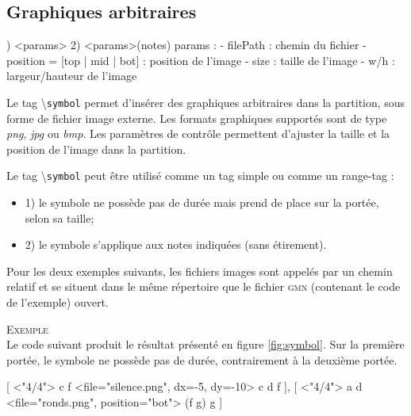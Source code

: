 \documentclass{article}
\newenvironment{gmncode}	{\vspace{-2mm}\small\verbatim}{\endverbatim\vspace{-2mm}}
\newcommand{\gmn}			{\textsc{gmn}}
\newcommand{\code}[1]		{{\small \texttt{#1}}}
\newcommand{\guidotag}[1]	{\textbackslash\code{#1}}
\newcommand{\exemple}		{\vspace{2mm}\hspace*{-6mm}\textsc{Exemple}}
\begin{document}
\subsection{Graphiques arbitraires}\label{subsec:graphiquesAbstraites}
\bigskip

\begin{gmncode}
1) \symbol<params>
2) \symbol<params>(notes)
  params : 
    - filePath : chemin du fichier
    - position = [top | mid | bot] :
      position de l'image
    - size : taille de l'image
    - w/h : largeur/hauteur de l'image
\end{gmncode}

Le tag \guidotag{symbol} permet d'insérer des graphiques arbitraires dans la partition, sous forme de fichier image externe. Les formats graphiques supportés sont de type \emph{png}, \emph{jpg} ou \emph{bmp}. Les paramètres de contrôle permettent d'ajuster la taille et la position de l'image dans la partition.

Le tag \guidotag{symbol} peut être utilisé comme un tag simple ou comme un range-tag :
\begin{itemize}
	\item 1) le symbole ne possède pas de durée mais prend de place sur la portée, selon sa taille;
	\item 2) le symbole s'applique aux notes indiquées (sans étirement).
\end{itemize}

Pour les deux exemples suivants, les fichiers images sont appelés par un chemin relatif et se situent dans le même répertoire que le fichier \gmn{} (contenant le code de l'exemple) ouvert.

\exemple\\
Le code suivant produit le résultat présenté en figure \ref{fig:symbol}. Sur la première portée, le symbole ne possède pas de durée, contrairement à la deuxième portée.

\begin{gmncode}
{
  [
    \meter<"4/4"> c f
    \symbol<file="silence.png", dx=-5,
        dy=-10> 
    c d f
  ],
  [
    \meter<"4/4"> a d
    \symbol<file="ronds.png",
        position="bot"> (f g) g
  ]
}
\end{gmncode}
\end{document}
